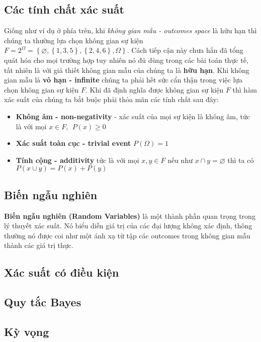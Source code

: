\documentclass[../main-report.tex]{subfiles}
\begin{document}
\subsection{Các tính chất xác suất}
Giống như ví dụ ở phía trên, khi \textit{không gian mẫu - outcomes space} là hữu hạn thì chúng ta thường lựa chọn không gian sự kiện $F=2^{\Omega} = \left \{ \varnothing , \left \{ 1, 3, 5 \right \}, \left \{ 2, 4, 6 \right \}, \Omega \right \}$. Cách tiếp cận này chưa hẳn đã tổng quát hóa cho mọi trường hợp tuy nhiên nó đủ dùng trong các bài toán thực tế, tất nhiên là với giả thiết không gian mẫu của chúng ta là \textbf{hữu hạn}. Khi không gian mẫu là\textbf{ vô hạn - infinite} chúng ta phải hết sức cẩn thận trong việc lựa chọn không gian sự kiện $F$. Khi đã định nghĩa được không gian sự kiện $F$ thì hàm xác suất của chúng ta bắt buộc phải thỏa mãn các tính chất sau đây:

\begin{itemize}
\item \textbf{Không âm - non-negativity} - xác suất của mọi sự kiện là không âm, tức là với mọi $x \in F,~~ P(x)\geq 0$
\item \textbf{Xác suất toàn cục - trivial event} $P(\Omega) = 1$
\item \textbf{Tính cộng - additivity} tức là với mọi $x, y \in F$ nếu như $x\cap y= \varnothing$ thì ta có $P(x\cup y) = P(x) + P(y)$
\end{itemize}
\subsection{Biến ngẫu nghiên}
\textbf{Biến ngẫu nghiên (Random Variables)} là một thành phần quan trọng trong lý thuyết xác suất. Nó biểu diễn giá trị của các đại lượng không xác định, thông thường nó được coi như một ánh xạ từ tập các outcomes trong không gian mẫu thành các giá trị thực.

\subsection{Xác suất có điều kiện}

\subsection{Quy tắc Bayes}

\subsection{Kỳ vọng}
\end{document}
